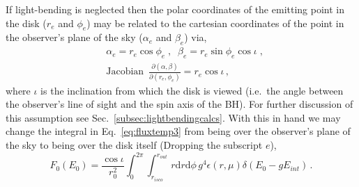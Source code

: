 If light-bending is neglected then the polar coordinates of the emitting point in the disk ($r_{e}$ and $\phi_{e}$) may be related to the cartesian coordinates of the point in the observer's plane of the sky ($\alpha_{e}$ and $\beta_{e}$) via,
\begin{eqnarray}\label{eq:negligiblelightbenging} 
& \alpha_{e}=r_{e}\cos\phi_{e} \; , \;\; \beta_{e}=r_{e}\sin\phi_{e}\cos \iota\; , \nonumber \\
&\textrm{Jacobian }\, \frac{\partial (\alpha,\beta)}{\partial (r_{e},\phi_{e})}=r_{e}\cos \iota \, ,\end{eqnarray}
where $\iota$ is the inclination from which the disk is viewed (i.e.\ the angle between the observer's line of sight and the spin axis of the BH). For further discussion of this assumption see Sec.\ \ref{subsec:lightbendingcalcs}. With this in hand we may change the integral in Eq.\ \ref{eq:fluxtemp3} from being over the observer's plane of the sky to being over the disk itself (Dropping the subscript $e$),
\begin{equation}\label{eq:fluxtemp4} F_{0}(E_{0})=\frac{\cos \iota}{r_{0}^{2}}\int_{0}^{2\pi}\int_{r_{isco}}^{r_{out}}r\textrm{d}r \textrm{d}\phi\, g^{4}\epsilon (r,\mu)\delta\left(E_{0}-gE_{int}\right)\, .\end{equation}

